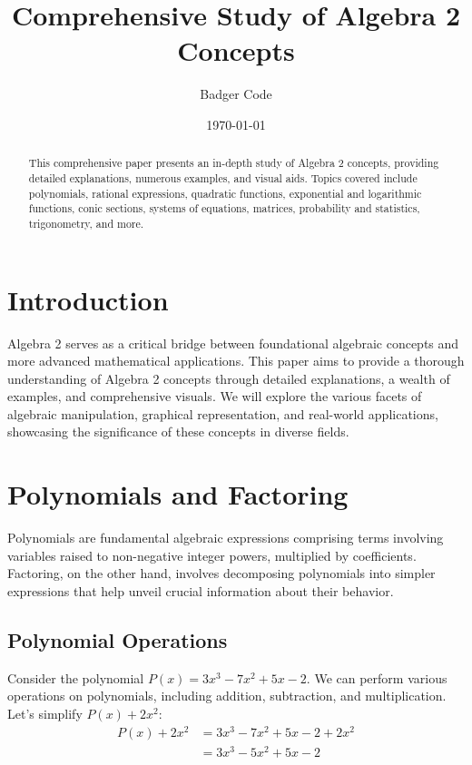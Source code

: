 \documentclass{article}
\title{Comprehensive Study of Algebra 2 Concepts}
\author{Badger Code}
\date{\today}
\begin{document}
\maketitle

\begin{abstract}
This comprehensive paper presents an in-depth study of Algebra 2 concepts, providing detailed explanations, numerous examples, and visual aids. Topics covered include polynomials, rational expressions, quadratic functions, exponential and logarithmic functions, conic sections, systems of equations, matrices, probability and statistics, trigonometry, and more.
\end{abstract}

\tableofcontents

\section{Introduction}
Algebra 2 serves as a critical bridge between foundational algebraic concepts and more advanced mathematical applications. This paper aims to provide a thorough understanding of Algebra 2 concepts through detailed explanations, a wealth of examples, and comprehensive visuals. We will explore the various facets of algebraic manipulation, graphical representation, and real-world applications, showcasing the significance of these concepts in diverse fields.

\section{Polynomials and Factoring}
Polynomials are fundamental algebraic expressions comprising terms involving variables raised to non-negative integer powers, multiplied by coefficients. Factoring, on the other hand, involves decomposing polynomials into simpler expressions that help unveil crucial information about their behavior.

\subsection{Polynomial Operations}
Consider the polynomial $P(x) = 3x^3 - 7x^2 + 5x - 2$. We can perform various operations on polynomials, including addition, subtraction, and multiplication. Let's simplify $P(x) + 2x^2$:
\begin{align*}
    P(x) + 2x^2 &= 3x^3 - 7x^2 + 5x - 2 + 2x^2 \\
    &= 3x^3 - 5x^2 + 5x - 2
\end{align*}
\end{document}
